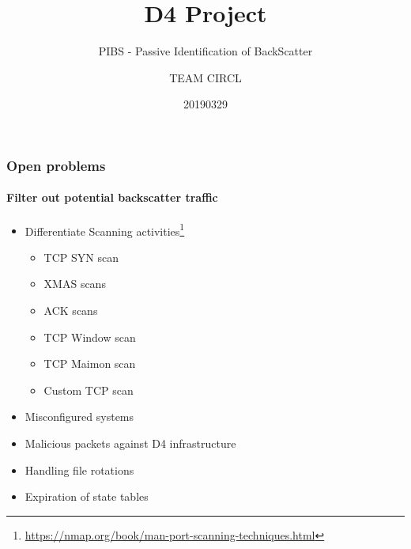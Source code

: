 \documentclass{beamer}
\title{D4 Project}
\subtitle{PIBS - Passive Identification of BackScatter}
\author{TEAM CIRCL}
\institute{Team CIRCL \\ \url{https://www.d4-project.org/}}
\date{20190329}
\begin{document}
    \begin{frame}
        \maketitle
    \end{frame}


\begin{frame}
    \frametitle{Open problems}
    \framesubtitle{Filter out potential backscatter traffic}
    \begin{itemize}
        \item Differentiate Scanning activities\footnote{\url{https://nmap.org/book/man-port-scanning-techniques.html}}
        \begin{itemize}
            \item TCP SYN scan
            \item XMAS scans
            \item ACK scans
            \item TCP Window scan
            \item TCP Maimon scan
            \item Custom TCP scan
        \end{itemize}
        \item Misconfigured systems
        \item Malicious packets against D4 infrastructure
	\item Handling file rotations
	\item Expiration of state tables
    \end{itemize}
\end{frame}
\end{document}
